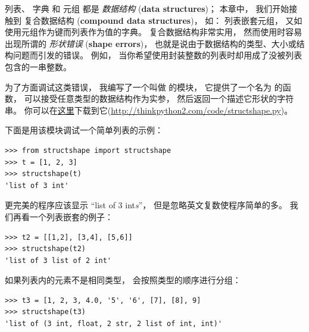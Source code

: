 {列表、  字典 和 元组 都是 {\em 数据结构} ({\bf data structures})；
本章中， 我们开始接触到 复合数据结构 ({\bf compound data structures})，
如： 列表嵌套元组， 又如使用元组作为键而列表作为值的字典。
复合数据结构非常实用， 然而使用时容易出现所谓的 {\em 形状错误} ({\bf shape errors})， 也就是说由于数据结构的类型、大小或结构问题而引发的错误。
例如， 当你希望使用封装整数的列表时却用成了没被列表包含的一串整数。
 


为了方面调试这类错误， 我编写了一个叫做   的模块，
它提供了一个名为  的函数， 可以接受任意类型的数据结构作为实参， 然后返回一个描述它形状的字符串。
你可以在\href{http://thinkpython2.com/code/structshape.py}{这里}下载到它(\url{http://thinkpython2.com/code/structshape.py})。


下面是用该模块调试一个简单列表的示例：

\begin{lstlisting}
>>> from structshape import structshape
>>> t = [1, 2, 3]
>>> structshape(t)
'list of 3 int'
\end{lstlisting}

%

更完美的程序应该显示 ``list of 3 int{\em s}''， 但是忽略英文复数使程序简单的多。
我们再看一个列表嵌套的例子：

\begin{lstlisting}
>>> t2 = [[1,2], [3,4], [5,6]]
>>> structshape(t2)
'list of 3 list of 2 int'
\end{lstlisting}

%

如果列表内的元素不是相同类型，  会按照类型的顺序进行分组：

\begin{lstlisting}
>>> t3 = [1, 2, 3, 4.0, '5', '6', [7], [8], 9]
>>> structshape(t3)
'list of (3 int, float, 2 str, 2 list of int, int)'
\end{lstlisting}

}
